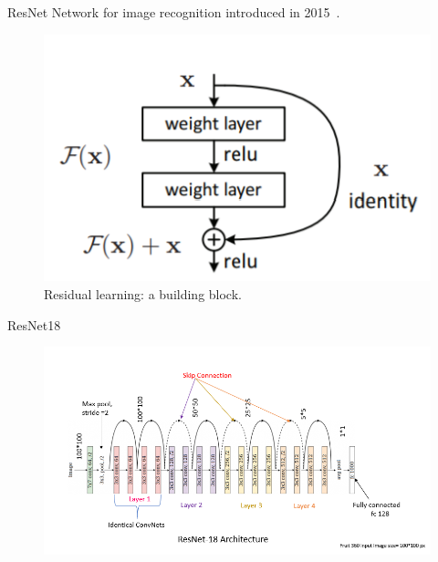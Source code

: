\documentclass[10pt]{beamer}
\begin{document}
\begin{frame}{ResNet}
    Network for image recognition introduced in 2015~\citep{he2015residual}.
    
    \begin{figure}
        \centering
        \includegraphics[scale=1]{report/midterm presentation/images/building_block_ResNet.png}
        \caption{Residual learning: a building block.}
        \label{fig:building_block_resnet}
    \end{figure}
    
    
\end{frame}

\begin{frame}{ResNet18}
    \begin{figure}
        \centering
        \includegraphics[scale=0.35]{report/midterm presentation/images/ResNet18.png}
        \label{fig:resnet18}
    \end{figure}
\end{frame}
\end{document}

